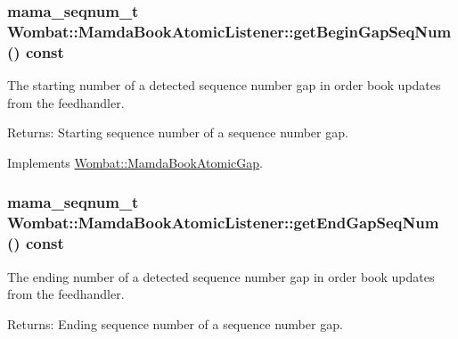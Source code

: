 \hypertarget{classWombat_1_1MamdaBookAtomicListener_9d33a337ef8f16888f6189f704ad1412}{
\subsubsection[getBeginGapSeqNum]{\setlength{\rightskip}{0pt plus 5cm}mama\_\-seqnum\_\-t Wombat::Mamda\-Book\-Atomic\-Listener::get\-Begin\-Gap\-Seq\-Num () const}}
\label{classWombat_1_1MamdaBookAtomicListener_9d33a337ef8f16888f6189f704ad1412}


The starting number of a detected sequence number gap in order book updates from the feedhandler. 

\begin{Desc}
\item[Returns:]Starting sequence number of a sequence number gap. \end{Desc}


Implements \hyperlink{classWombat_1_1MamdaBookAtomicGap_8023460971323b5c43af54d8a39592e2}{Wombat::Mamda\-Book\-Atomic\-Gap}.\hypertarget{classWombat_1_1MamdaBookAtomicListener_b965aab29205f4f229ad021094d6b16e}{
\subsubsection[getEndGapSeqNum]{\setlength{\rightskip}{0pt plus 5cm}mama\_\-seqnum\_\-t Wombat::Mamda\-Book\-Atomic\-Listener::get\-End\-Gap\-Seq\-Num () const}}
\label{classWombat_1_1MamdaBookAtomicListener_b965aab29205f4f229ad021094d6b16e}


The ending number of a detected sequence number gap in order book updates from the feedhandler. 

\begin{Desc}
\item[Returns:]Ending sequence number of a sequence number gap. \end{Desc}


